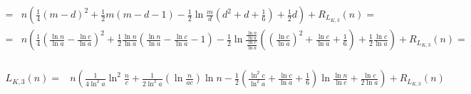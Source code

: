 \documentclass{article}
\begin{document}
\begin{align*}
=& n \left( \frac{1}{4} {\left( m - d \right)}^2 + \frac{1}{2} m \left( m - d - 1 \right) - \frac{1}{2} \ln{\frac{m}{d}} \left( d^2 + d + \frac{1}{6} \right) + \frac{1}{2} d \right) + R_{L_{K,3}}(n) = \\
=& n \left( \frac{1}{4} {\left( \frac{\ln{n}}{\ln{a}} - \frac{\ln{c}}{\ln{a}} \right)}^2 + \frac{1}{2} \frac{\ln{n}}{\ln{a}} \left( \frac{\ln{n}}{\ln{a}} - \frac{\ln{c}}{\ln{a}} - 1 \right) - \frac{1}{2} \ln{\frac{\frac{\ln{n}}{\ln{a}}}{\frac{\ln{c}}{\ln{a}}}} \left( {\left( \frac{\ln{c}}{\ln{a}} \right) }^2 + \frac{\ln{c}}{\ln{a}} + \frac{1}{6} \right) + \frac{1}{2} \frac{\ln{c}}{\ln{a}} \right) + R_{L_{K,3}}(n) = \\
\end{align*}

\begin{align*}
L_{K,3}(n) =& n \left( \frac{1}{4 \ln^2{a}} \ln^2{\frac{n}{c}} + \frac{1}{2 \ln^2{a}} \left( \ln{\frac{n}{a c}} \right) \ln{n} - \frac{1}{2} \left( \frac{\ln^2{c}}{\ln^2{a}} + \frac{\ln{c}}{\ln{a}} + \frac{1}{6} \right) \ln{\frac{\ln{n}}{\ln{c}}} + \frac{\ln{c}}{2 \ln{a}} \right) + R_{L_{K,3}}(n)
\end{align*}
\end{document}
